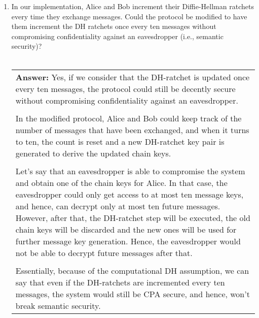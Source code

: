 \documentclass[11pt]{article}
\newenvironment{answer}
{\vspace{2mm}\begin{tabular}{|p{0.9\textwidth}|}
 \hline{\bf Answer:} }{\\ \hline\end{tabular}\vspace{1cm}}
\newenvironment{problems}
{\begin{enumerate}[label=\bfseries Question \arabic*.,align=left,leftmargin=1em,labelwidth=1.5em]}
{\end{enumerate}}
\begin{document}
\newlength{\boxwidth}
\setlength{\boxwidth}{\textwidth}
\addtolength{\boxwidth}{-2cm}

\vspace{1cm}

\begin{problems}


\item In our implementation, Alice and Bob increment their Diffie-Hellman ratchets every time they exchange messages. Could the protocol be modified to have them increment the DH ratchets once every ten messages without compromising confidentiality against an eavesdropper (i.e., semantic security)?
 \\ \\
\begin{answer}
Yes, if we consider that the DH-ratchet is updated once every ten messages, the protocol could still be decently secure without compromising confidentiality against an eavesdropper. 
\\\\
In the modified protocol, Alice and Bob could keep track of the number of messages that have been exchanged, and when it turns to ten, the count is reset and a new DH-ratchet key pair is generated to derive the updated chain keys.
\\ \\
Let's say that an eavesdropper is able to compromise the system and obtain one of the chain keys for Alice. In that case, the eavesdropper could only get access to at most ten message keys, and hence, can decrypt only at most ten future messages. However, after that, the DH-ratchet step will be executed, the old chain keys will be discarded and the new ones will be used for further message key generation. Hence, the eavesdropper would not be able to decrypt future messages after that. 
\\\\
Essentially, because of the computational DH assumption, we can say that even if the DH-ratchets are incremented every ten messages, the system would still be CPA secure, and hence, won't break semantic security.
\end{answer}


\end{problems}
\end{document}
